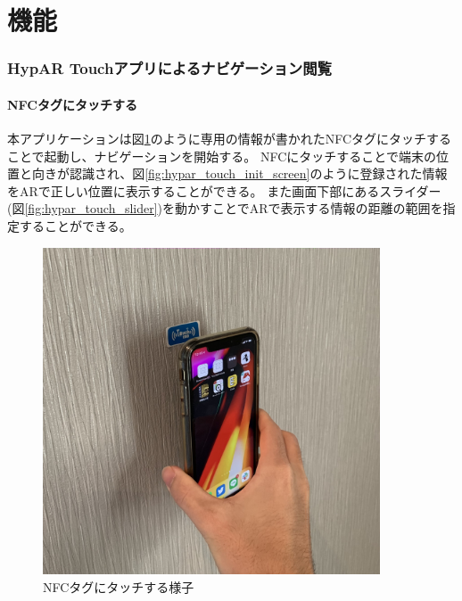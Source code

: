 \section{機能}

\subsubsection{HypAR Touchアプリによるナビゲーション閲覧}
\paragraph*{NFCタグにタッチする}
本アプリケーションは図\ref{fig:touch_nfc}のように専用の情報が書かれたNFCタグにタッチすることで起動し、ナビゲーションを開始する。
NFCにタッチすることで端末の位置と向きが認識され、図\ref{fig:hypar_touch_init_screen}のように登録された情報をARで正しい位置に表示することができる。
また画面下部にあるスライダー(図\ref{fig:hypar_touch_slider})を動かすことでARで表示する情報の距離の範囲を指定することができる。

\begin{figure}[h]
  \centering
  \includegraphics[width=100mm]{images/touch_nfc.jpg}
  \caption{NFCタグにタッチする様子} \label{fig:touch_nfc}
\end{figure}

